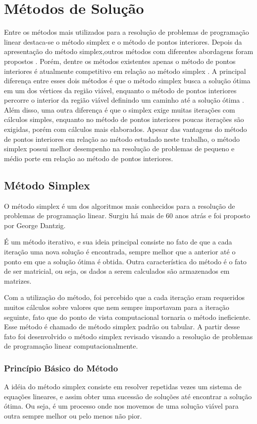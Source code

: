 \chapter{Métodos de Solução}
Entre os métodos mais utilizados para a resolução de problemas de programação linear destaca-se o método simplex  e o método de pontos interiores. 
Depois da apresentação do método simplex,outros métodos com diferentes abordagens foram propostos \cite{Todd}. Porém, dentre os métodos existentes apenas o método de pontos interiores é atualmente competitivo em relação ao método simplex . 
A principal diferença entre esses dois métodos é que o método simplex busca a solução ótima em um dos vértices da região viável, enquanto o método de pontos interiores percorre o interior da região viável definindo um caminho até a solução ótima \cite{MaculanPI}. Além disso, uma outra diferença é que o simplex exige muitas iterações com cálculos simples, enquanto no método de pontos interiores poucas iterações são exigidas, porém com cálculos mais elaborados.
Apesar das vantagens do método de pontos interiores em relação ao método estudado neste trabalho, o método simplex possui melhor desempenho na resolução de problemas de pequeno e médio porte em relação ao método de pontos interiores.

\section{Método Simplex}
O método simplex é um dos algoritmos mais conhecidos para a resolução de problemas de programação linear. Surgiu há mais de 60 anos atrás e foi proposto por George Dantzig.  

É um método iterativo, e sua ideia principal consiste no fato de que a cada iteração uma nova solução é encontrada, sempre melhor que a anterior até o ponto em que a solução ótima é obtida. Outra característica do método é o fato de ser matricial, ou seja, os dados a serem calculados são armazenados em matrizes.  

Com a utilização do método, foi percebido que a cada iteração eram requeridos muitos cálculos sobre valores que nem sempre importavam para a iteração seguinte, fato que do ponto de vista computacional tornaria o método ineficiente. Esse método é chamado de método simplex padrão ou tabular. A partir desse fato foi desenvolvido o método simplex revisado visando a resolução de problemas de programação linear computacionalmente.

\subsection{Princípio Básico do Método}
A idéia do método simplex consiste em resolver repetidas vezes um sistema de equações lineares, e assim obter uma sucessão de soluções até encontrar a solução ótima. Ou seja, é um processo onde nos movemos de uma solução viável para outra sempre melhor ou pelo menos não pior.

